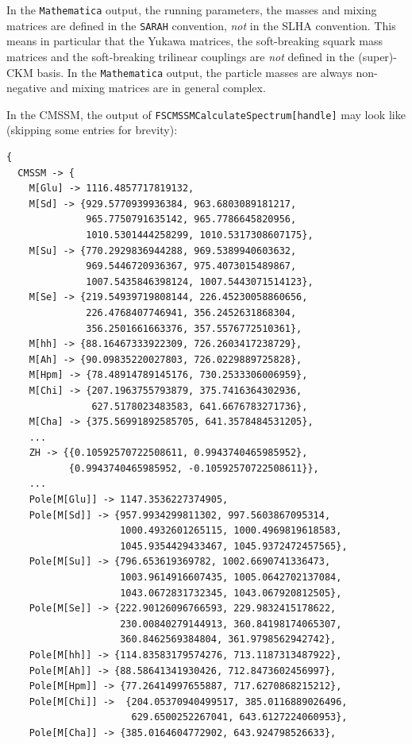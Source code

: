 \documentclass[final,3p,11pt,pdflatex]{elsarticle}
\makeatletter
\newcommand{\sarah}{\texttt{SARAH}\@\xspace}
\newcommand{\mathematica}{\texttt{Ma\-the\-ma\-ti\-ca}\xspace}
\newcommand{\code}[1]{\lstinline|#1|}  %
\makeatother
\begin{document}
In the \mathematica output, the running parameters, the masses and
mixing matrices are defined in the \sarah convention, \emph{not} in the
SLHA convention.  This means in particular that the Yukawa matrices,
the soft-breaking squark mass matrices and the soft-breaking trilinear
couplings are \emph{not} defined in the (super)-CKM basis.  In the
\mathematica output, the particle masses are always non-negative and mixing
matrices are in general complex.
%
\begin{example}
  In the CMSSM, the output of \code{FSCMSSMCalculateSpectrum[handle]}
  may look like (skipping some entries for brevity):
%
\begin{lstlisting}
{
  CMSSM -> {
    M[Glu] -> 1116.4857717819132,
    M[Sd] -> {929.5770939936384, 963.6803089181217,
              965.7750791635142, 965.7786645820956,
              1010.5301444258299, 1010.5317308607175},
    M[Su] -> {770.2929836944288, 969.5389940603632,
              969.5446720936367, 975.4073015489867,
              1007.5435846398124, 1007.5443071514123},
    M[Se] -> {219.54939719808144, 226.45230058860656,
              226.4768407746941, 356.2452631868304,
              356.2501661663376, 357.5576772510361},
    M[hh] -> {88.16467333922309, 726.2603417238729},
    M[Ah] -> {90.09835220027803, 726.0229889725828},
    M[Hpm] -> {78.48914789145176, 730.2533306006959},
    M[Chi] -> {207.1963755793879, 375.7416364302936,
               627.5178023483583, 641.6676783271736},
    M[Cha] -> {375.56991892585705, 641.3578484531205},
    ...
    ZH -> {{0.10592570722508611, 0.9943740465985952},
           {0.9943740465985952, -0.10592570722508611}},
    ...
    Pole[M[Glu]] -> 1147.3536227374905,
    Pole[M[Sd]] -> {957.9934299811302, 997.5603867095314,
                    1000.4932601265115, 1000.4969819618583,
                    1045.9354429433467, 1045.9372472457565},
    Pole[M[Su]] -> {796.653619369782, 1002.6690741336473,
                    1003.9614916607435, 1005.0642702137084,
                    1043.0672831732345, 1043.067920812505},
    Pole[M[Se]] -> {222.90126096766593, 229.9832415178622,
                    230.00840279144913, 360.84198174065307,
                    360.8462569384804, 361.9798562942742},
    Pole[M[hh]] -> {114.83583179574276, 713.1187313487922},
    Pole[M[Ah]] -> {88.58641341930426, 712.8473602456997},
    Pole[M[Hpm]] -> {77.26414997655887, 717.6270868215212},
    Pole[M[Chi]] ->  {204.05370940499517, 385.0116889026496,
                      629.6500252267041, 643.6127224060953},
    Pole[M[Cha]] -> {385.0164604772902, 643.924798526633},

\end{lstlisting}
\end{example}
\end{document}
